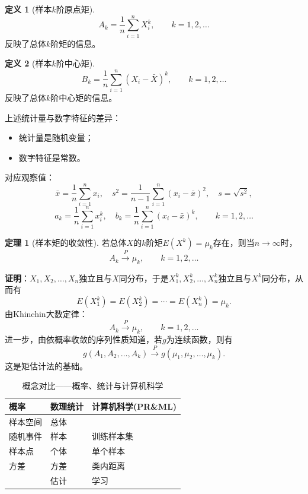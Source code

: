 \documentclass[11pt,a4paper]{report}
\theoremstyle{definition}
\newtheorem{definition}{定义}[chapter]
\newtheorem{theorem}{定理}[chapter]
\begin{document}
\begin{definition}[样本$k$阶原点矩]
\[
A_{k}=\frac{1}{n}\sum_{i=1}^{n}X_{i}^{k},\qquad k=1,2,\ldots
\]
反映了总体$k$阶矩的信息。
\end{definition}

\begin{definition}[样本$k$阶中心矩]
\[
B_{k}=\frac{1}{n}\sum_{i=1}^{n}(X_{i}-\bar{X})^{k},\qquad k=1,2,\ldots
\]
反映了总体$k$阶中心矩的信息。
\end{definition}

上述统计量与数字特征的差异：
\begin{itemize}[leftmargin=2em]
    \item 统计量是随机变量；
    \item 数字特征是常数。
\end{itemize}

对应观察值：
\[
\bar{x}=\frac{1}{n}\sum_{i=1}^{n}x_{i},\quad s^{2}=\frac{1}{n-1}\sum_{i=1}^{n}(x_{i}-\bar{x})^{2},\quad s=\sqrt{s^{2}},
\]
\[
a_{k}=\frac{1}{n}\sum_{i=1}^{n}x_{i}^{k},\quad b_{k}=\frac{1}{n}\sum_{i=1}^{n}(x_{i}-\bar{x})^{k},\qquad k=1,2,\ldots
\]

\begin{theorem}[样本矩的收敛性]
若总体$X$的$k$阶矩$E(X^{k})=\mu_{k}$存在，则当$n\to\infty$时，
\[
A_{k}\stackrel{P}{\longrightarrow}\mu_{k},\qquad k=1,2,\ldots
\]
\end{theorem}

\textbf{证明}：$X_{1},X_{2},\ldots,X_{n}$独立且与$X$同分布，于是$X_{1}^{k},X_{2}^{k},\ldots,X_{n}^{k}$独立且与$X^{k}$同分布，从而有
\[
E(X_{1}^{k})=E(X_{2}^{k})=\cdots=E(X_{n}^{k})=\mu_{k}.
\]
由Khinchin大数定律：
\[
A_{k}\stackrel{P}{\longrightarrow}\mu_{k},\qquad k=1,2,\ldots
\]
进一步，由依概率收敛的序列性质知道，若$g$为连续函数，则有
\[
g(A_{1},A_{2},\ldots,A_{k})\stackrel{P}{\longrightarrow}g(\mu_{1},\mu_{2},\ldots,\mu_{k}).
\]
这是矩估计法的基础。

\begin{table}[htbp]
\centering
\caption{概念对比——概率、统计与计算机科学}
\begin{tabular}{@{}lll@{}}
\toprule
\textbf{概率} & \textbf{数理统计} & \textbf{计算机科学(PR\&ML)} \\
\midrule
样本空间 & 总体 & \\
随机事件 & 样本 & 训练样本集 \\
样本点 & 个体 & 单个样本 \\
方差 & 方差 & 类内距离 \\
& 估计 & 学习 \\
\bottomrule
\end{tabular}
\end{table}
\end{document}
